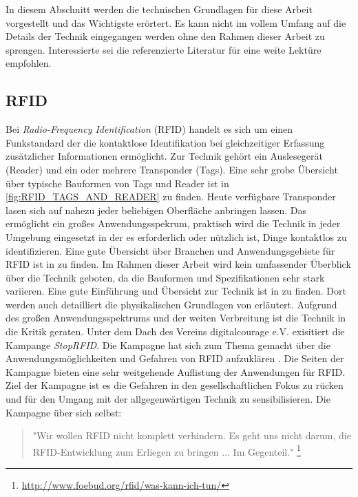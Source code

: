 In diesem Abschnitt werden die technischen Grundlagen für diese Arbeit vorgestellt und das Wichtigste erörtert. Es kann nicht im vollem Umfang auf die Details der Technik eingegangen werden ohne den Rahmen dieser Arbeit zu sprengen. Interessierte sei die referenzierte Literatur für eine weite Lektüre empfohlen.
%
\subsection{RFID}
%
Bei \textit{Radio-Frequency Identification} (RFID) handelt es sich um einen Funkstandard der die kontaktlose Identifikation bei gleichzeitiger Erfassung zusätzlicher Informationen ermöglicht. Zur Technik gehört ein Auslesegerät (Reader) und ein oder mehrere Transponder (Tags). Eine sehr grobe Übersicht über typische Bauformen von Tags und Reader ist in \ref{fig:RFID_TAGS_AND_READER} zu finden.  Heute verfügbare Transponder lasen sich auf nahezu jeder beliebigen Oberfläche anbringen lassen. Das ermöglicht ein großes Anwendungsspekrum, praktisch wird die Technik in jeder Umgebung eingesetzt in der es erforderlich oder nützlich ist, Dinge kontaktlos zu identifizieren. Eine gute Übersicht über Branchen und Anwendungsgebiete für RFID ist in \cite{RFIDJournal} zu finden. Im Rahmen dieser Arbeit wird kein umfassender Überblick über die Technik geboten, da die Bauformen und Spezifikationen sehr stark variieren. Eine gute Einführung und Übersicht zur Technik ist in \cite{finkenzeller2008rfid} zu finden. Dort werden auch detailliert die physikalischen Grundlagen von erläutert. Aufgrund des großen Anwendungsspektrums und der weiten Verbreitung ist die Technik in die Kritik geraten. Unter dem Dach des Vereins digitalcourage e.V. exisitiert die Kampange \textit{StopRFID}. Die Kampagne hat sich zum Thema gemacht über die Anwendungsmöglichkeiten und Gefahren von RFID aufzuklären \cite{stoprfid2013}. Die Seiten der Kampagne bieten eine sehr weitgehende Auflistung der Anwendungen für RFID. Ziel der Kampagne ist es die Gefahren in den gesellschaftlichen Fokus zu rücken und für den Umgang mit der allgegenwärtigen Technik zu sensibilisieren. Die Kampagne über sich selbst:
\begin{quote}
"Wir wollen RFID nicht komplett verhindern. Es geht uns nicht darum, die RFID-Entwicklung zum Erliegen zu bringen ... Im Gegenteil." \footnote{\url{http://www.foebud.org/rfid/was-kann-ich-tun/}}
\end{quote}
%
